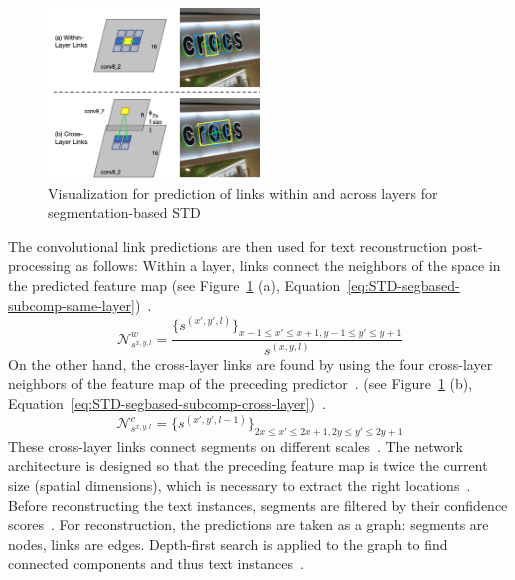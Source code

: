\begin{figure}[ht]
    \centering
    \includegraphics[width=0.5\textwidth]{img/STD-seg-based-links-Shi-Detecting-2017.png}
    \caption[Link prediction for segmentation-based STD]{%
        Visualization for prediction of links within and across layers for segmentation-based
        STD~\citep{shi_detecting_2017}\label{fig:STD-segbased-component-links}
    }
\end{figure}
The convolutional link predictions are then used for text reconstruction post-processing as follows:
Within a layer, links connect the neighbors of the space in the predicted feature map
(see Figure~\ref{fig:STD-segbased-component-links} (a),
Equation~\ref{eq:STD-segbased-subcomp-same-layer})~\citep{shi_detecting_2017}.
\begin{equation}\label{eq:STD-segbased-subcomp-same-layer}
    \mathcal{N}_{s^{x,y,l}}^w =
        \frac{{\{s^{(x',y',l)}\}}_{x-1\leq x'\leq x+1,y-1\leq y'\leq y+1}}{s^{(x,y,l)}}
\end{equation}
On the other hand, the cross-layer links are found by using the four cross-layer neighbors of the
feature map of the preceding predictor~\citep{shi_detecting_2017}.
(see Figure~\ref{fig:STD-segbased-component-links} (b),
Equation~\ref{eq:STD-segbased-subcomp-cross-layer})~\citep{shi_detecting_2017}.
\begin{equation}\label{eq:STD-segbased-subcomp-cross-layer}
    \mathcal{N}_{s^{x,y,l}}^c = {\{s^{(x',y',l-1)}\}}_{2x\leq x'\leq 2x+1,2y\leq y'\leq 2y+1}
\end{equation}
These cross-layer links connect segments on different scales~\citep{shi_detecting_2017}.
The network architecture is designed so that the preceding feature map is twice the current size
(spatial dimensions), which is necessary to extract the right
locations~\citep{shi_detecting_2017}.
Before reconstructing the text instances, segments are filtered by their confidence
scores~\citep{shi_detecting_2017}.
For reconstruction, the predictions are taken as a graph: segments are nodes, links are edges.
Depth-first search is applied to the graph to find connected components and thus text
instances~\citep{shi_detecting_2017}.

